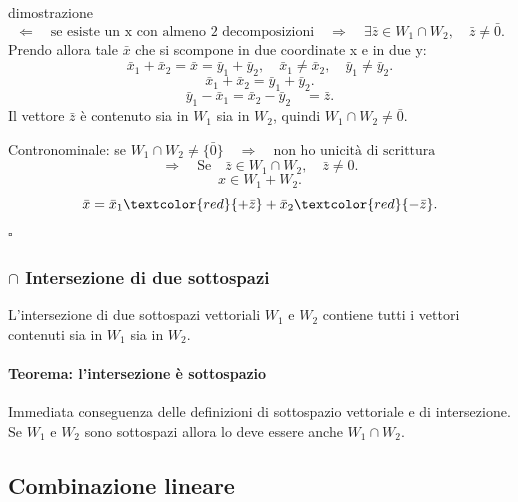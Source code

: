 \documentclass[x11names]{article}
\newcommand*{\QEDB}{\null\nobreak\hfill\ensuremath{\square}}%
\begin{document}
\begin{es}{dimostrazione}
\[
\Leftarrow \quad \text{se esiste un x con almeno 2 decomposizioni} \quad \Rightarrow \quad \exists \bar{z} \in W_1 \cap W_2,\quad \bar{z} \neq \bar{0}
.\] 
Prendo allora tale $\bar{x}$ che si scompone in due coordinate x e in due y:
\[
\bar{x}_{1} + \bar{x}_{2} = \bar{x} = \bar{y}_{1} + \bar{y}_{2}, \quad \bar{x}_{1} \neq \bar{x}_{2}, \quad \bar{y}_{1} \neq \bar{y}_{2}
.\] 
\[
\bar{x}_{1} + \bar{x}_{2} = \bar{y}_{1} + \bar{y}_{2}
.\] 
\[
\bar{y}_{1} - \bar{x}_{1} = \bar{x}_{2} - \bar{y}_{2} \quad = \bar{z}
.\] 
Il vettore $\bar{z}$ è contenuto sia in $W_1$ sia in $W_2$, quindi $W_1 \cap W_2 \neq \bar{0}$.

Contronominale: se $W_1 \cap W_2 \neq \{\bar{0}\} \quad \Rightarrow \quad \text{non ho unicità di scrittura}$
\[
\Rightarrow \quad \text{Se} \quad \bar{z} \in W_1 \cap W_2, \quad\bar{z} \neq 0
.\] 
\[
x \in W_1 + W_2
.\] 
\[
\bar{x} = \bar{x}_{1} \textcolor{red}{+\bar{z}} + \bar{x}_{2} \textcolor{red}{-\bar{z}}
.\]  \QEDB
\end{es}


\subsubsection{$\cap$ Intersezione di due sottospazi}
L'intersezione di due sottospazi vettoriali $W_1$ e $W_2$ contiene tutti i vettori contenuti sia in $W_1$ sia in $W_2$.

\begin{center}
	\colorbox{myred}{\begin{minipage}{5.75in}
			\begin{redes}{}
				\paragraph{Teorema: l'intersezione è sottospazio}
				Immediata conseguenza delle definizioni di sottospazio vettoriale e di intersezione. Se $W_1$ e $W_2$ sono sottospazi allora lo deve essere anche $W_1 \cap W_2$.
					
			\end{redes}
	\end{minipage}}        
\end{center}



\subsection{Combinazione lineare}
\end{document}
